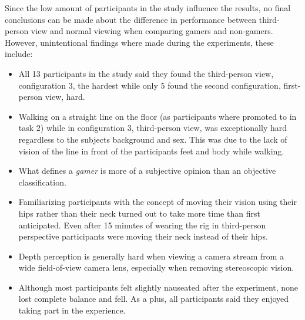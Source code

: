 \documentclass[runningheads,a4paper,oribibl]{llncs}
\begin{document}
Since the low amount of participants in the study influence the results, no final conclusions can be made about the difference in performance between third-person view and normal viewing when comparing gamers and non-gamers. However, unintentional findings where made during the experiments, these include:
\begin{itemize}
	\item All 13 participants in the study said they found the third-person view, configuration 3, the hardest while only 5 found the second configuration, first-person view, hard.

	\item Walking on a straight line on the floor (as participants where promoted to in task 2) while in configuration 3, third-person view, was exceptionally hard regardless to the subjects background and sex. This was due to the lack of vision of the line in front of the participants feet and body while walking. 

	\item What defines a \emph{gamer} is more of a subjective opinion than an objective classification.

	\item Familiarizing participants with the concept of moving their vision using their hips rather than their neck turned out to take more time than first anticipated. Even after 15 minutes of wearing the rig in third-person perspective participants were moving their neck instead of their hips.

	\item Depth perception is generally hard when viewing a camera stream from a wide field-of-view camera lens, especially when removing stereoscopic vision.

	\item Although most participants felt slightly nauseated after the experiment, none lost complete balance and fell. As a plus, all participants said they enjoyed taking part in the experience.
\end{itemize}
\end{document}

